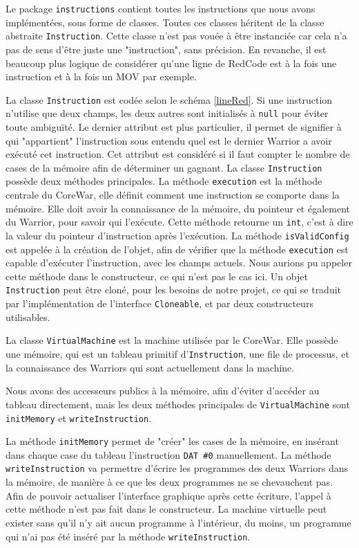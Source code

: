 \documentclass[hidelinks]{report}
\begin{document}
Le package \texttt{instructions} contient toutes les instructions que nous avons implémentées, sous forme de classes. Toutes ces classes héritent de la classe abstraite \texttt{Instruction}. Cette classe n'est pas vouée à être instanciée car cela n'a pas de sens d'être juste une "instruction", sans précision. En revanche, il est beaucoup plus logique de considérer qu'une ligne de RedCode est à la fois une instruction et à la fois un MOV par exemple.

La classe \texttt{Instruction} est codée selon le schéma \autoref{lineRed}. Si une instruction n'utilise que deux champs, les deux autres sont initialisés à \texttt{null} pour éviter toute ambiguïté. Le dernier attribut est plus particulier, il permet de signifier à qui "appartient" l'instruction sous entendu quel est le dernier Warrior a avoir exécuté cet instruction. Cet attribut est considéré si il faut compter le nombre de cases de la mémoire afin de déterminer un gagnant. La classe \texttt{Instruction} possède deux méthodes principales. La méthode \texttt{execution} est la méthode centrale du CoreWar, elle définit comment une instruction se comporte dans la mémoire. Elle doit avoir la connaissance de la mémoire, du pointeur et également du Warrior, pour savoir qui l'exécute. Cette méthode retourne un \texttt{int}, c'est à dire la valeur du pointeur d'instruction après l'exécution. La méthode \texttt{isValidConfig} est appelée à la création de l'objet, afin de vérifier que la méthode \texttt{execution} est capable d'exécuter l'instruction, avec les champs actuels. Nous aurions pu appeler cette méthode dans le constructeur, ce qui n'est pas le cas ici. Un objet \texttt{Instruction} peut être cloné, pour les besoins de notre projet, ce qui se traduit par l'implémentation de l'interface \texttt{Cloneable}, et par deux constructeurs utilisables.

La classe \texttt{VirtualMachine} est la machine utilisée par le CoreWar. Elle possède une mémoire, qui est un tableau primitif d'\texttt{Instruction}, une file de processus, et la connaissance des Warriors qui sont actuellement dans la machine.

Nous avons des accesseurs publics à la mémoire, afin d'éviter d'accéder au tableau directement, mais les deux méthodes principales de \texttt{VirtualMachine} sont \texttt{initMemory} et \texttt{writeInstruction}.

La méthode \texttt{initMemory} permet de "créer" les cases de la mémoire, en insérant dans chaque case du tableau l'instruction \texttt{DAT \#0} manuellement. La méthode \texttt{writeInstruction} va permettre d'écrire les programmes des deux Warriors dans la mémoire, de manière à ce que les deux programmes ne se chevauchent pas. Afin de pouvoir actualiser l'interface graphique après cette écriture, l'appel à cette méthode n'est pas fait dans le constructeur. La machine virtuelle peut exister sans qu'il n'y ait aucun programme à l'intérieur, du moins, un programme qui n'ai pas été inséré par la méthode \texttt{writeInstruction}.
\end{document}
